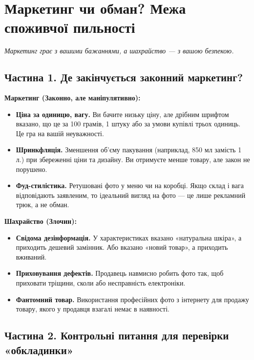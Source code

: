﻿%
\chapter{Маркетинг чи обман? Межа споживчої пильності}
\label{apdx:marketing_logic}

\small
\setlength{\parskip}{3pt}

\textit{Маркетинг грає з вашими бажаннями, а шахрайство — з вашою безпекою.}


\section*{Частина 1. Де закінчується законний маркетинг?}
\vspace{-0.1cm}

\textbf{Маркетинг (Законно, але маніпулятивно):}
\begin{itemize}[leftmargin=2em, itemsep=0pt, parsep=3pt]
    \item \textbf{Ціна за одиницю, вагу.} Ви бачите низьку ціну, але дрібним шрифтом вказано, що це за 100 грамів, 1 штуку або за умови купівлі трьох одиниць. Це гра на вашій неуважності.
    \item \textbf{Шринкфляція.} Зменшення об'єму пакування (наприклад, 850 мл замість 1 л.) при збереженні ціни та дизайну. Ви отримуєте менше товару, але закон не порушено.
    \item \textbf{Фуд-стилістика.} Ретушовані фото у меню чи на коробці. Якщо склад і вага відповідають заявленим, то ідеальний вигляд на фото — це лише рекламний трюк, а не обман.
\end{itemize}

\textbf{Шахрайство (Злочин):}
\begin{itemize}[leftmargin=2em, itemsep=0pt, parsep=3pt]
    \item \textbf{Свідома дезінформація.} У характеристиках вказано «натуральна шкіра», а приходить дешевий замінник. Або вказано «новий товар», а приходить вживаний.
    \item \textbf{Приховування дефектів.} Продавець навмисно робить фото так, щоб приховати тріщини, сколи або несправність електроніки.
    \item \textbf{Фантомний товар.} Використання професійних фото з інтернету для продажу товару, якого у продавця взагалі немає в наявності.
\end{itemize}

 

\section*{Частина 2. Контрольні питання для перевірки «обкладинки»}
\vspace{-0.1cm}



